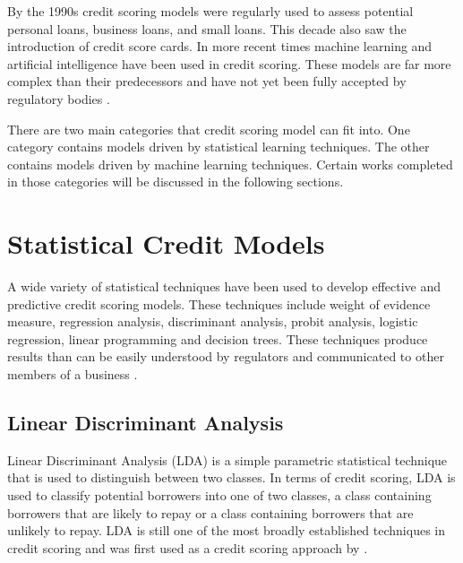 By the 1990s credit scoring models were regularly used to assess potential personal loans, business loans, and small loans. This decade also saw the introduction of credit score cards. In more recent times machine learning and artificial intelligence have been used in credit scoring. These models are far more complex than their predecessors and have not yet been fully accepted by regulatory bodies \parencite{CreditScoringTechniquesOverview}. 
\newpage

There are two main categories that credit scoring model can fit into. One category contains models driven by statistical learning techniques. The other contains models driven by machine learning techniques. Certain works completed in those categories will be discussed in the following sections. 


\section{Statistical Credit Models}

A wide variety of statistical techniques have been used to develop effective and predictive credit scoring models. These techniques include weight of evidence measure, regression analysis, discriminant analysis,
probit analysis, logistic regression, linear programming and decision trees. These techniques produce results than can be easily understood by regulators and communicated to other members of a business \parencite{CreditScoringTechniquesLitReview}. 

\subsection{Linear Discriminant Analysis}

Linear Discriminant Analysis (LDA) is a simple parametric statistical technique that is used to distinguish between two classes. In terms of credit scoring, LDA is used to classify potential borrowers into one of two classes, a class containing borrowers that are likely to repay or a class containing borrowers that are unlikely to repay. LDA is still one of the most broadly established techniques in credit scoring and was first used as a credit scoring approach by \textcite{DurandLDA}. \\

